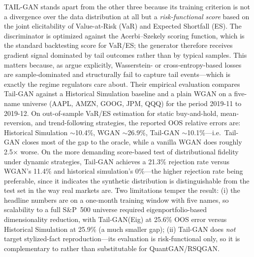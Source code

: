 TAIL-GAN \citep{cont2025tailgan} stands apart from the other three because its training criterion is not a divergence over the data distribution at all but a \emph{risk-functional score} based on the joint elicitability of Value-at-Risk (VaR) and Expected Shortfall (ES). The discriminator is optimized against the Acerbi--Szekely scoring function, which is the standard backtesting score for VaR/ES; the generator therefore receives gradient signal dominated by tail outcomes rather than by typical samples. This matters because, as \citep{cont2025tailgan} argue explicitly, Wasserstein- or cross-entropy-based losses are sample-dominated and structurally fail to capture tail events---which is exactly the regime regulators care about. Their empirical evaluation compares Tail-GAN against a Historical Simulation baseline and a plain WGAN on a five-name universe (AAPL, AMZN, GOOG, JPM, QQQ) for the period 2019-11 to 2019-12. On out-of-sample VaR/ES estimation for static buy-and-hold, mean-reversion, and trend-following strategies, the reported OOS relative errors are: Historical Simulation $\sim$10.4\%, WGAN $\sim$26.9\%, Tail-GAN $\sim$10.1\%---i.e.\ Tail-GAN closes most of the gap to the oracle, while a vanilla WGAN does roughly 2.5$\times$ worse. On the more demanding score-based test of distributional fidelity under dynamic strategies, Tail-GAN achieves a 21.3\% rejection rate versus WGAN's 11.4\% and historical simulation's 0\%---the higher rejection rate being preferable, since it indicates the synthetic distribution is distinguishable from the test set in the way real markets are. Two limitations temper the result: (i) the headline numbers are on a one-month training window with five names, so scalability to a full S\&P~500 universe required eigenportfolio-based dimensionality reduction, with Tail-GAN(Eig) at 25.6\% OOS error versus Historical Simulation at 25.9\% (a much smaller gap); (ii) Tail-GAN does \emph{not} target stylized-fact reproduction---its evaluation is risk-functional only, so it is complementary to rather than substitutable for QuantGAN/RSQGAN.

